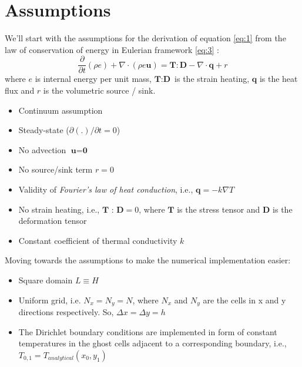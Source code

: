 \documentclass[12pt]{amsart}   %
\begin{document}
\section{Assumptions \label{sec:assumptions}}
We'll start with the assumptions for the derivation of equation \ref{eq:1} from the law of conservation of energy in Eulerian framework \ref{eq:3} \cite{oden2011introduction}:
    \begin{equation} \label{eq:3}
        \frac{ \partial }{ \partial t }{(\rho e) + \nabla \cdot(\rho e \textbf{u}) = \textbf{T}:\textbf{D} -\nabla \cdot \textbf{q} + r}
    \end{equation}
where $e$ is internal energy per unit mass, $\textbf{T}:\textbf{D}$ is the strain heating, $\textbf{q}$ is the heat flux and $r$ is the volumetric source / sink. 
\begin{itemize}
\item Continuum assumption
    \item Steady-state ($\partial(.) / \partial t = 0$)
    \item No advection $\textbf{u}=\textbf{0}$
    \item No source/sink term $r=0$
    \item Validity of \textit{Fourier's law of heat conduction}, i.e., $\textbf{q} =-k \nabla T$
    \item No strain heating, i.e., $\textbf{T : D}=0$, where $\textbf{T}$ is the stress tensor and $\textbf{D}$ is the deformation tensor
    \item Constant coefficient of thermal conductivity $k$
\end{itemize}

Moving towards the assumptions to make the numerical implementation easier:
\begin{itemize}
    \item Square domain $L\equiv H$
    \item Uniform grid, i.e. $N_x=N_y=N$, where $N_x$ and $N_y$ are the cells in x and y directions respectively. So, $\Delta x = \Delta y = h$
    \item The Dirichlet boundary conditions are implemented in form of constant temperatures in the ghost cells adjacent to a corresponding boundary, i.e., $T_{0,1}=T_{analytical}(x_0,y_1)$
\end{itemize}
\end{document}

